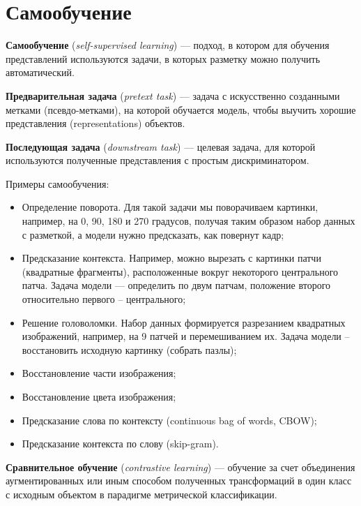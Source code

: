 \section{Самообучение}

\begin{definition}
    \textbf{Самообучение} (\textit{self-supervised learning}) --- подход, в котором для обучения представлений используются задачи, в которых разметку можно получить автоматический.
\end{definition}

\begin{definition}
    \textbf{Предварительная задача} (\textit{pretext task}) --- задача с искусственно созданными метками (псевдо-метками), на которой обучается модель, чтобы выучить хорошие представления (representations) объектов.
\end{definition}

\begin{definition}
    \textbf{Последующая задача} (\textit{downstream task}) --- целевая задача, для которой используются полученные представления с простым дискриминатором.
\end{definition}

Примеры самообучения:
\begin{itemize}
    \item Определение поворота. Для такой задачи мы поворачиваем картинки, например, на 0, 90, 180 и 270 градусов, получая таким образом набор данных с разметкой, а модели нужно предсказать, как повернут кадр;
    \item Предсказание контекста. Например, можно вырезать с картинки патчи (квадратные фрагменты), расположенные вокруг некоторого центрального патча. Задача модели --- определить по двум патчам, положение второго относительно первого -- центрального;
    \item Решение головоломки. Набор данных формируется разрезанием квадратных изображений, например, на 9 патчей и перемешиванием их. Задача модели -- восстановить исходную картинку (собрать пазлы);
    \item Восстановление части изображения;
    \item Восстановление цвета изображения;
    \item Предсказание слова по контексту (continuous bag of words, CBOW);
    \item Предсказание контекста по слову (skip-gram).
\end{itemize}

\begin{definition}
    \textbf{Сравнительное обучение} (\textit{contrastive learning}) --- обучение за счет объединения аугментированных или иным способом полученных трансформаций в один класс с исходным объектом в парадигме метрической классификации.
\end{definition}

